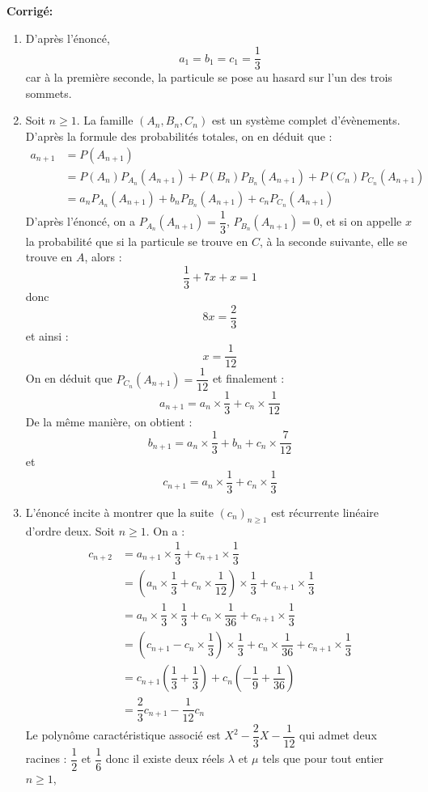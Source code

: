 \documentclass[a4paper,twoside,french,10pt]{VcCours}
\newcommand{\corr}{\textbf{Corrigé:}}
\begin{document}
\newpage

\corr 

\begin{enumerate}
\item D'après l'énoncé,
$$ a_1= b_1=c_1 = \dfrac{1}{3}$$
car à la première seconde, la particule se pose au hasard sur l'un des trois sommets.
\item Soit $n \geq 1$. La famille $(A_n,B_n,C_n)$ est un système complet d'évènements. D'après la formule des probabilités totales, on en déduit que :
\begin{align*}
a_{n+1} & = P(A_{n+1}) \\
& = P(A_n) P_{A_n}(A_{n+1}) + P(B_n) P_{B_n}(A_{n+1}) + P(C_n) P_{C_n}(A_{n+1})  \\
& = a_n P_{A_n}(A_{n+1}) + b_n P_{B_n}(A_{n+1}) + c_n P_{C_n}(A_{n+1})  
\end{align*}
D'après l'énoncé, on a $P_{A_n}(A_{n+1})= \dfrac{1}{3}$, $P_{B_n}(A_{n+1}) = 0$, et si on appelle $x$ la probabilité que si la particule se trouve en $C$, à la seconde suivante, elle se trouve en $A$, alors :
$$ \dfrac{1}{3} + 7x + x = 1$$
donc 
$$ 8x = \dfrac{2}{3}$$
et ainsi :
$$ x = \dfrac{1}{12}$$
On en déduit que $P_{C_n}(A_{n+1}) = \dfrac{1}{12}$ et finalement :
$$ a_{n+1} = a_n \times \dfrac{1}{3}  + c_n \times \dfrac{1}{12}$$
De la même manière, on obtient :
$$ b_{n+1} = a_n \times \dfrac{1}{3} + b_n + c_n \times \dfrac{7}{12} $$
et 
$$ c_{n+1} = a_n \times \dfrac{1}{3} + c_n \times \dfrac{1}{3}$$
\item L'énoncé incite à montrer que la suite $(c_n)_{n \geq 1}$ est récurrente linéaire d'ordre deux. Soit $n \geq 1$. On a :
\begin{align*}
c_{n+2} & = a_{n+1} \times \dfrac{1}{3} + c_{n+1} \times \dfrac{1}{3} \\
& = \left(  a_n \times \dfrac{1}{3}  + c_n \times \dfrac{1}{12} \right) \times \dfrac{1}{3} + c_{n+1} \times \dfrac{1}{3} \\
& = a_n \times \dfrac{1}{3} \times \dfrac{1}{3}  + c_n \times \dfrac{1}{36}  + c_{n+1} \times \dfrac{1}{3} \\
& = \left( c_{n+1} - c_n \times \dfrac{1}{3} \right) \times \dfrac{1}{3}  + c_n \times \dfrac{1}{36}  + c_{n+1} \times \dfrac{1}{3} \\ 
& = c_{n+1} \left( \dfrac{1}{3} + \dfrac{1}{3} \right) + c_n \left(-\dfrac{1}{9} + \dfrac{1}{36} \right) \\
& = \dfrac{2}{3} c_{n+1} - \dfrac{1}{12} c_n
\end{align*}
Le polynôme caractéristique associé est $X^2 - \dfrac{2}{3} X - \dfrac{1}{12}$ qui admet deux racines : $\dfrac{1}{2}$ et $\dfrac{1}{6}$ donc il existe deux réels $\lambda$ et $\mu$ tels que pour tout entier $n \geq 1$,

\end{enumerate}
\end{document}
